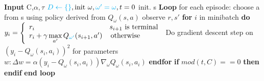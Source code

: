   \begin{algorithm}[H]
    \caption{Deep-Q-Learning (DQN) with Replay-Buffer and Target Networks \cite{mnih2013playingatarideepreinforcement}}\label{dqn}
    \begin{algorithmic}
      \STATE \textbf{Input} C,$\alpha,\tau$
      \STATE ${\color{cyan}D \gets \{\}}, \text{init } \omega, {\color{cyan}\omega'=\omega}, t = 0$
      \STATE init. s
      \STATE \textbf{Loop} for each episode:
      \STATE \quad choose a from s using policy derived from $Q_\omega(s,a)$
      \STATE \quad observe $r,s'$ 
      \STATE {}
      \STATE {}
      \STATE \quad \textbf{for} $i$ in minibatch \textbf{do} 
      \STATE \qquad $y_i = \left\{
	\begin{array}{ll}
	  r_i & s_{i+1} \text{ is terminal} \\
	  r_i + \gamma \max\limits_{a'}Q_{\color{cyan}\omega'}(s_{i+1},a') & \, \textrm{otherwise} \\
	\end{array}
      \right. $
      \STATE \qquad Do gradient descent step on $(y_i- Q_\omega(s_i,a_i))^2$ for parameters
      \STATE \qquad  $w: \Delta w = \alpha (y_i -  Q_\omega(s_i,a_i))\nabla_\omega  Q_\omega(s_i,a_i) $
      \STATE \quad \textbf{endfor}
      \STATE \quad \textbf{if }$mod(t,C) == 0$ \textbf{then}
      \STATE {}
      \STATE \quad \textbf{endif}
      \STATE \textbf{end loop}
    \end{algorithmic}
  \end{algorithm}

